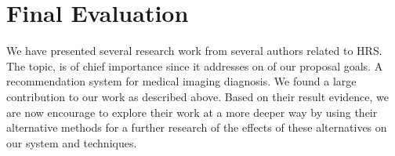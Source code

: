 \section{Final Evaluation}

We have presented several research work from several authors related to HRS. The topic, is of chief importance since it addresses on of our proposal goals. A recommendation system for medical imaging diagnosis. We found a large contribution to our work as described above. Based on their result evidence, we are now encourage to explore their work at a more deeper way by using their alternative methods for a further research of the effects of these alternatives on our system and techniques.
